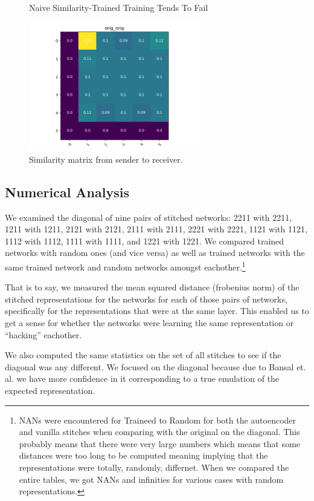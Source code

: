 \documentclass{article} %
\begin{document}
\label{Figure6}
\begin{center}
   \begin{figure}[h!]
      \centering
      \caption{Naive Similarity-Trained Training Tends To Fail}
      \includegraphics[width=7.5cm]{resnet1111_1111_autoencoder.png}
      \caption*{Similarity matrix from sender to receiver.}
   \end{figure}
\end{center}

\subsection*{Numerical Analysis}
We examined the diagonal of nine pairs of stitched networks: 2211 with 2211, 1211 with 1211, 
2121 with 2121, 2111 with 2111, 2221 with 2221, 1121 with 1121, 1112 with 1112, 1111 with 1111, 
and 1221 with 1221. We compared trained networks with random ones (and vice versa) as well as trained
networks with the same trained network and random networks amongst eachother.\footnote{NANs were encountered for 
Traineed to Random for both the autoencoder and vanilla stitches when comparing with the original on the diagonal.
This probably means  that there were
very large numbers which means that some distances were too long to be computed meaning implying that
the representations were totally, randomly, differnet. When we compared the entire tables, we got NANs and infinities
for various cases with random representations.}

That is to say, we measured the mean squared distance (frobenius norm) of the stitched representations for the networks
for each of those pairs of networks, specifically for the representations that were at the same layer. This enabled us
to get a sense for whether the networks were learning the same representation or ``hacking'' eachother.

We also computed the same statistics on the set of all stitches to see if the diagonal was any different. We focused
on the diagonal because due to Bansal et. al. we have more confidence in it corresponding to a true emulation of the
expected representation.
\end{document}
